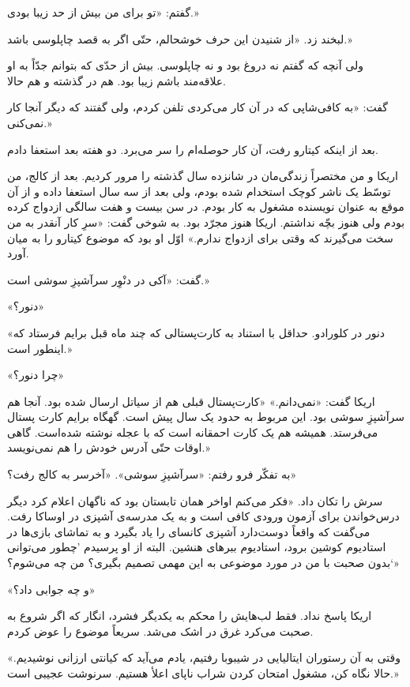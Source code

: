\documentclass[a5paper]{book}
\begin{document}
گفتم: «تو برای من بیش از حد زیبا بودی.»

لبخند زد. «از شنیدن این حرف خوشحالم، حتّی اگر به قصد چاپلوسی باشد.»

ولی آنچه که گفتم نه دروغ بود و نه چاپلوسی. بیش از حدّی که بتوانم جدّاً به او علاقه‌مند باشم زیبا بود. هم در گذشته و هم حالا.

گفت: «به کافی‌شاپی که در آن کار می‌کردی تلفن کردم، ولی گفتند که دیگر آنجا کار نمی‌کنی.»

بعد از اینکه کیتارو رفت، آن کار حوصله‌ام را سر می‌برد. دو هفته بعد استعفا دادم.

اریکا و من مختصراً زندگی‌مان در شانزده سال گذشته را مرور کردیم. بعد از کالج، من توسّط یک ناشر کوچک استخدام شده بودم، ولی بعد از سه سال استعفا داده و از آن موقع به عنوان نویسنده مشغول به کار بودم. در سن بیست و هفت سالگی ازدواج کرده بودم ولی هنوز بچّه نداشتم. اریکا هنوز مجرّد بود. به شوخی گفت: «سرِ کار آنقدر به من سخت می‌گیرند که وقتی برای ازدواج ندارم.» اوّل او بود که موضوع کیتارو را به میان آورد.

گفت: «آکی در دنْوِر سرآشپزِ سوشی است.»

«دنور؟»

«دنور در کلورادو. حداقل با استناد به کارت‌پستالی که چند ماه قبل برایم فرستاد که اینطور است.»

«چرا دنور؟»

اریکا گفت: «نمی‌دانم.» «کارت‌پستال قبلی هم از سیاتل ارسال شده بود. آنجا هم سرآشپزِ سوشی بود. این مربوط به حدود یک سال پیش است. گهگاه برایم کارت پستال می‌فرستد. همیشه هم یک کارت احمقانه است که با عجله نوشته شده‌است. گاهی اوقات حتّی آدرس خودش را هم نمی‌نویسد.»

به تفکّر فرو رفتم: «سرآشپزِ سوشی». «آخرسر به کالج رفت؟»

سرش را تکان داد. «فکر می‌کنم اواخر همان تابستان بود که ناگهان اعلام کرد دیگر درس‌خواندن برای آزمون ورودی کافی است و به یک مدرسه‌ی آشپزی در اوساکا رفت. می‌گفت که واقعاً دوست‌دارد آشپزی کانسای را یاد بگیرد و به تماشای بازی‌ها در استادیوم کوشین برود، استادیوم ببرهای هنشین. البته از او پرسیدم 'چطور می‌توانی بدون صحبت با من در مورد موضوعی به این مهمی تصمیم بگیری؟ من چه می‌شوم؟`»

«و چه جوابی داد؟»

اریکا پاسخ نداد. فقط لب‌هایش را محکم به یکدیگر فشرد، انگار که اگر شروع به صحبت می‌کرد غرق در اشک می‌شد. سریعاً موضوع را عوض کردم.

«وقتی به آن رستوران ایتالیایی در شیبوبا رفتیم، یادم می‌آید که کیانتی ارزانی نوشیدیم. حالا نگاه کن، مشغول امتحان کردن شراب ناپای اعلأ هستیم. سرنوشت عجیبی است.»
\end{document}
